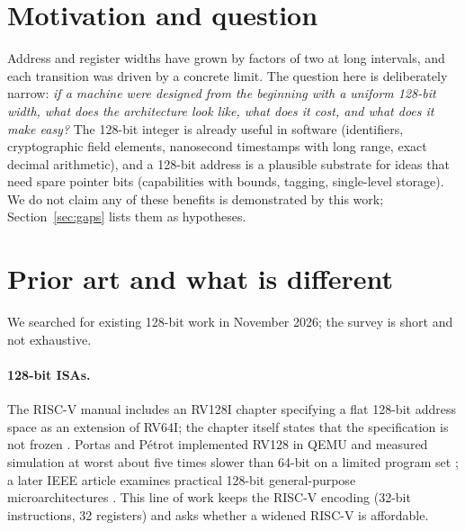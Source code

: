 \documentclass[10pt,a4paper]{article}
\begin{document}
\begin{abstract}
at roughly 12--17 cycles, so the flag is a precondition of the design rather than a refinement. We state precisely what is \emph{not} shown: there is no memory-management unit, no atomics, no floating point, no optimising compiler (only a toy compiler for a Python subset), no formal semantics and no cycle-accurate timing model; MAC latency and tag-cache costs are parameters, and the gate depth is not a timing result for any process. None of the results are claims about performance on hardware, and we make no claim that Sigil is faster than tagged capabilities. We close with a gap analysis and a research agenda.
\end{abstract}

\section{Motivation and question}
Address and register widths have grown by factors of two at long intervals, and each transition was driven by a concrete limit. The question here is deliberately narrow: \emph{if a machine were designed from the beginning with a uniform 128-bit width, what does the architecture look like, what does it cost, and what does it make easy?} The 128-bit integer is already useful in software (identifiers, cryptographic field elements, nanosecond timestamps with long range, exact decimal arithmetic), and a 128-bit address is a plausible substrate for ideas that need spare pointer bits (capabilities with bounds, tagging, single-level storage). We do not claim any of these benefits is demonstrated by this work; Section~\ref{sec:gaps} lists them as hypotheses.

\section{Prior art and what is different}\label{sec:prior}
We searched for existing 128-bit work in November 2026; the survey is short and not exhaustive.
\paragraph{128-bit ISAs.} The RISC-V manual includes an RV128I chapter specifying a flat 128-bit address space as an extension of RV64I; the chapter itself states that the specification is not frozen \citep{riscv}. Portas and P\'etrot implemented RV128 in QEMU and measured simulation at worst about five times slower than 64-bit on a limited program set \citep{portas}; a later IEEE article examines practical 128-bit general-purpose microarchitectures \citep{rv128micro}. This line of work keeps the RISC-V encoding (32-bit instructions, 32 registers) and asks whether a widened RISC-V is affordable.
\end{document}
